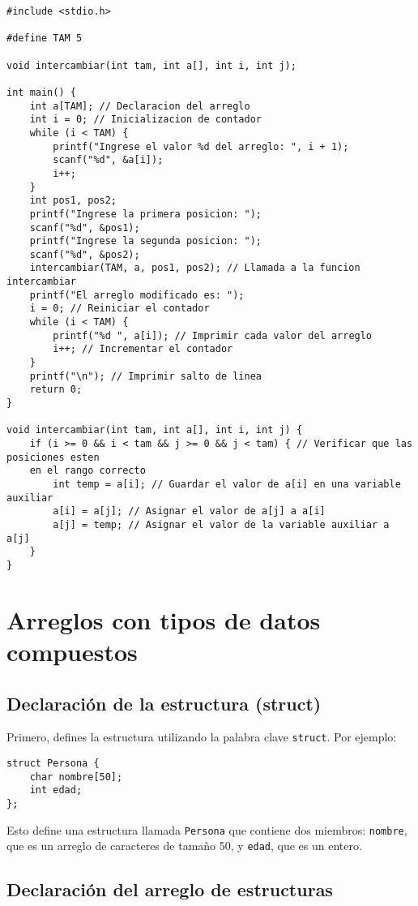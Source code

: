 \documentclass{article}
\begin{document}
\begin{verbatim}
#include <stdio.h>

#define TAM 5

void intercambiar(int tam, int a[], int i, int j);

int main() {
    int a[TAM]; // Declaracion del arreglo
    int i = 0; // Inicializacion de contador
    while (i < TAM) {
        printf("Ingrese el valor %d del arreglo: ", i + 1);
        scanf("%d", &a[i]);
        i++;
    }
    int pos1, pos2;
    printf("Ingrese la primera posicion: ");
    scanf("%d", &pos1);
    printf("Ingrese la segunda posicion: ");
    scanf("%d", &pos2);
    intercambiar(TAM, a, pos1, pos2); // Llamada a la funcion intercambiar
    printf("El arreglo modificado es: ");
    i = 0; // Reiniciar el contador
    while (i < TAM) {
        printf("%d ", a[i]); // Imprimir cada valor del arreglo
        i++; // Incrementar el contador
    }
    printf("\n"); // Imprimir salto de linea
    return 0;
}

void intercambiar(int tam, int a[], int i, int j) {
    if (i >= 0 && i < tam && j >= 0 && j < tam) { // Verificar que las posiciones esten 
    en el rango correcto
        int temp = a[i]; // Guardar el valor de a[i] en una variable auxiliar
        a[i] = a[j]; // Asignar el valor de a[j] a a[i]
        a[j] = temp; // Asignar el valor de la variable auxiliar a a[j]
    }
}
\end{verbatim}

\section{Arreglos con tipos de datos compuestos}

\subsection{Declaración de la estructura (struct)}

Primero, defines la estructura utilizando la palabra clave \texttt{struct}. Por ejemplo:

\begin{verbatim}
struct Persona {
    char nombre[50];
    int edad;
};
\end{verbatim}

Esto define una estructura llamada \texttt{Persona} que contiene dos miembros: \texttt{nombre}, que es un arreglo de caracteres de tamaño 50, y \texttt{edad}, que es un entero.

\subsection{Declaración del arreglo de estructuras}
\end{document}
